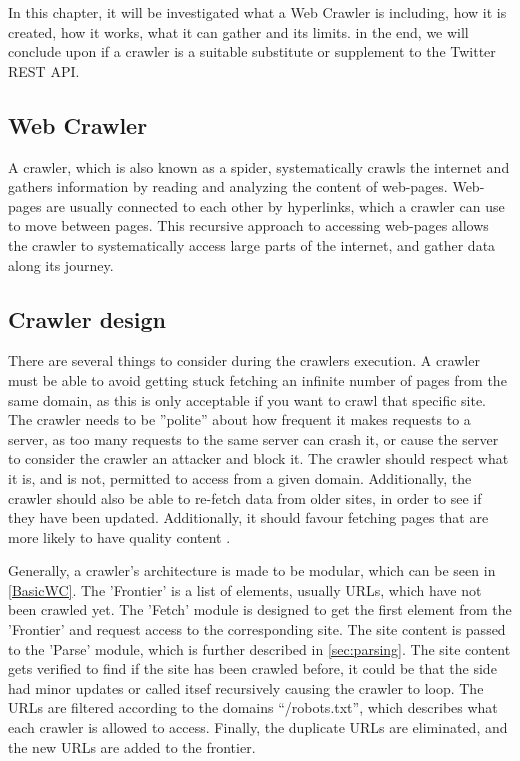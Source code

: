 In this chapter, it will be investigated what a Web Crawler is including, how it
is created, how it works, what it can gather and its limits. in the end, we will
conclude upon if a crawler is a suitable substitute or supplement to
the Twitter \ac{REST} \ac{API}.

\subsection{Web Crawler}\label{subsec:crawler}
A crawler, which is also known as a spider, systematically crawls the internet
and gathers information by reading and analyzing the content of web-pages.
Web-pages are usually connected to each other by hyperlinks, which a
crawler can use to move between pages. This recursive approach to accessing
web-pages allows the crawler to systematically access large parts of the
internet, and gather data along its journey. %

\subsection{Crawler design}%
There are several things to consider during the crawlers execution. A crawler
must be able to avoid getting stuck fetching an infinite number of pages from
the same domain, as this is only acceptable if you want to crawl that specific
site.
The crawler needs to be ''polite'' about how frequent it makes requests to a
server, as too many requests to the same server can crash it, or cause the
server to consider the crawler an attacker and block it.
The crawler should respect what it is, and is not, permitted to access from a
given domain. Additionally, the crawler should also be able to re-fetch data
from older sites, in order to see if they have been updated. Additionally, it
should favour fetching pages that are more likely to have quality content \citep[Ch.
20.1]{manning2008introduction}.\nl

Generally, a crawler's architecture is made to be modular, which can be seen in
\autoref{BasicWC}. The 'Frontier' is a list of elements, usually URLs, which
have not been crawled yet. The 'Fetch' module is designed to get the first
element from the 'Frontier' and request access to the corresponding site. The
site content is passed to the 'Parse' module, which is further described in
\autoref{sec:parsing}. The site content gets verified to find if the site has
been crawled before, it could be that the side had minor updates or called
itsef recursively causing the crawler to loop.
The URLs are filtered according to the domains ``/robots.txt'', which describes
what each crawler is allowed to access. Finally, the duplicate URLs are
eliminated, and the new URLs are added to the frontier.\nl%


